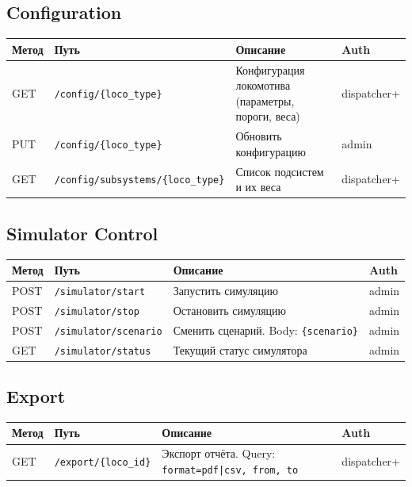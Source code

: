 \documentclass[12pt,a4paper]{article}
\newcommand{\code}[1]{\texttt{#1}}
\begin{document}
\subsection{Configuration}

\begin{tabularx}{\textwidth}{l l X l}
\toprule
\textbf{Метод} & \textbf{Путь} & \textbf{Описание} & \textbf{Auth} \\
\midrule
GET & \code{/config/\{loco\_type\}} & Конфигурация локомотива (параметры, пороги, веса) & dispatcher+ \\
PUT & \code{/config/\{loco\_type\}} & Обновить конфигурацию & admin \\
GET & \code{/config/subsystems/\{loco\_type\}} & Список подсистем и их веса & dispatcher+ \\
\bottomrule
\end{tabularx}

\subsection{Simulator Control}

\begin{tabularx}{\textwidth}{l l X l}
\toprule
\textbf{Метод} & \textbf{Путь} & \textbf{Описание} & \textbf{Auth} \\
\midrule
POST & \code{/simulator/start} & Запустить симуляцию & admin \\
POST & \code{/simulator/stop} & Остановить симуляцию & admin \\
POST & \code{/simulator/scenario} & Сменить сценарий. Body: \code{\{scenario\}} & admin \\
GET & \code{/simulator/status} & Текущий статус симулятора & admin \\
\bottomrule
\end{tabularx}

\subsection{Export}

\begin{tabularx}{\textwidth}{l l X l}
\toprule
\textbf{Метод} & \textbf{Путь} & \textbf{Описание} & \textbf{Auth} \\
\midrule
GET & \code{/export/\{loco\_id\}} & Экспорт отчёта. Query: \code{format=pdf|csv, from, to} & dispatcher+ \\
\bottomrule
\end{tabularx}
\end{document}
